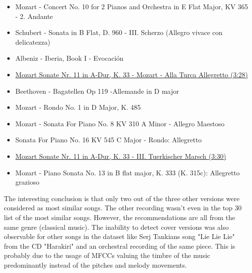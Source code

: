 \begin{itemize}
	\setlength\itemsep{-0.5em}
	\item Mozart - Concert No. 10 for 2 Pianos and Orchestra in E Flat Major, KV 365 - 2. Andante
	\item Schubert - Sonata in B Flat, D. 960 - III. Scherzo (Allegro vivace con delicatezza)
	\item Albeniz - Iberia, Book I - Evocaci\'on
	\item \underline{Mozart Sonate Nr. 11 in A-Dur, K. 33 - Mozart - Alla Turca Allegretto (3:28)}
	\item Beethoven - Bagatellen Op 119 -Allemande in D major
	\item Mozart - Rondo No. 1 in D Major, K. 485
	\item Mozart - Sonata For Piano No. 8 KV 310 A Minor - Allegro Maestoso
	\item Sonata For Piano No. 16 KV 545 C Major - Rondo: Allegretto
	\item \underline{Mozart Sonate Nr. 11 in A-Dur, K. 33 - III. Tuerkischer Marsch (3:30)}
	\item Mozart - Piano Sonata No. 13 in B flat major, K. 333 (K. 315c): Allegretto grazioso
	
\end{itemize}
\noindent The interesting conclusion is that only two out of the three other versions were considered as most similar songs. The other recording wasn't even in the top 30 list of the most similar songs. However, the recommendations are all from the same genre (classical music). The inability to detect cover versions was also observable for other songs in the dataset like Serj Tankians song "Lie Lie Lie" from the CD "Harakiri" and an orchestral recording of the same piece. This is probably due to the usage of MFCCs valuing the timbre of the music predominantly instead of the pitches and melody movements. 

